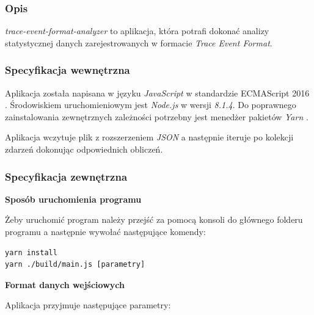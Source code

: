\documentclass[polish, twoside, 12pt]{mwart}
\begin{document}
\subsubsection{Opis}

\emph{trace-event-format-analyzer} to aplikacja, która potrafi dokonać analizy statystycznej danych zarejestrowanych w formacie \emph{Trace Event Format}.

\subsubsection{Specyfikacja wewnętrzna}

Aplikacja została napisana w języku \emph{JavaScript} w standardzie ECMAScript 2016 \cite{es2016}. Środowiskiem uruchomieniowym jest \emph{Node.js} \cite{node.js} w wersji \emph{8.1.4}. Do poprawnego zainstalowania zewnętrznych zależności potrzebny jest menedżer pakietów \emph{Yarn} \cite{yarn}.

Aplikacja wczytuje plik z rozszerzeniem \emph{JSON} a następnie iteruje po kolekcji zdarzeń dokonując odpowiednich obliczeń.

\subsubsection{Specyfikacja zewnętrzna}

\textbf{Sposób uruchomienia programu} \newline

Żeby uruchomić program należy przejść za pomocą konsoli do głównego folderu programu a następnie wywołać następujące komendy:

\begin{lstlisting}
yarn install
yarn ./build/main.js [parametry]
\end{lstlisting}

\textbf{Format danych wejściowych} \newline

Aplikacja przyjmuje następujące parametry:
\end{document}
